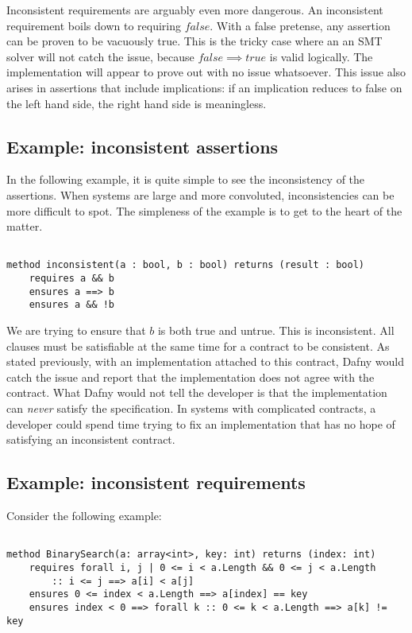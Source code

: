 \documentclass{article}
\begin{document}
Inconsistent requirements are arguably even more dangerous. An inconsistent requirement boils down to requiring
 \(false\). With a false pretense, any assertion can be proven to be vacuously true. This is the tricky case
 where an an SMT solver will not catch the issue, because \(false \implies true\) is valid logically. The implementation
 will appear to prove out with no issue whatsoever. This issue also arises in assertions that include implications: if
 an implication reduces to false on the left hand side, the right hand side is meaningless.

\subsection*{Example: inconsistent assertions}

In the following example, it is quite simple to see the inconsistency of the assertions. When systems are large and more
convoluted, inconsistencies can be more difficult to spot. The simpleness of the example is to get to the heart of the matter.

\begin{lstlisting}

method inconsistent(a : bool, b : bool) returns (result : bool)
    requires a && b
    ensures a ==> b
    ensures a && !b

\end{lstlisting}

We are trying to ensure that \(b\) is both true and untrue. This is inconsistent. All clauses must be satisfiable
at the same time for a contract to be consistent. As stated previously, with an implementation attached to this contract,
Dafny would catch the issue and report that the implementation does not agree with the contract. What Dafny would not
tell the developer is that the implementation can {\it never} satisfy the specification. In systems with complicated
contracts, a developer could spend time trying to fix an implementation that has no hope of satisfying an inconsistent
contract.

\subsection*{Example: inconsistent requirements}

Consider the following example:

\begin{lstlisting}

method BinarySearch(a: array<int>, key: int) returns (index: int)
    requires forall i, j | 0 <= i < a.Length && 0 <= j < a.Length
        :: i <= j ==> a[i] < a[j]
    ensures 0 <= index < a.Length ==> a[index] == key
    ensures index < 0 ==> forall k :: 0 <= k < a.Length ==> a[k] != key

\end{lstlisting}
\end{document}
